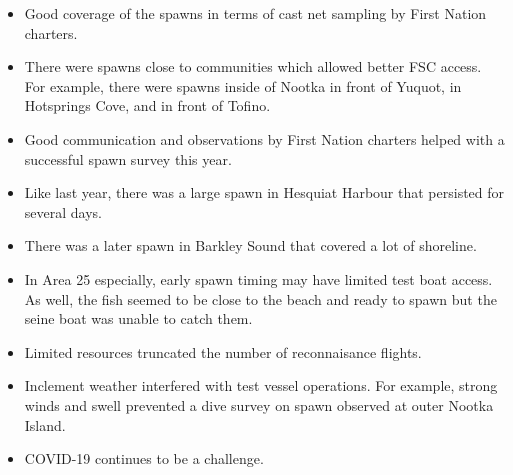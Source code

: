 \begin{itemize}

\item Good coverage of the spawns in terms of cast net sampling by First Nation charters.

\item There were spawns close to communities which allowed better FSC access.
For example, there were spawns inside of Nootka in front of Yuquot,
in Hotsprings Cove, and in front of Tofino.

\item Good communication and observations by First Nation charters
helped with a successful spawn survey this year.

\item Like last year, there was a large spawn in Hesquiat Harbour
that persisted for several days.

\item There was a later spawn in Barkley Sound that covered a lot of shoreline.

\item In Area 25 especially, early spawn timing may have limited test boat access.
As well, the fish seemed to be close to the beach and ready to spawn but
the seine boat was unable to catch them.

\item Limited resources truncated the number of reconnaisance flights.

\item Inclement weather interfered with test vessel operations.
For example, strong winds and swell prevented a dive survey
on spawn observed at outer Nootka Island.

\item COVID-19 continues to be a challenge.

\end{itemize}
